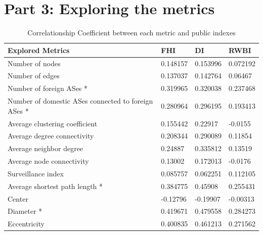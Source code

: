 \documentclass{article}
\begin{document}
\section*{Part 3: Exploring the metrics}

\bigskip

\begin{table}[ht]
\centering
\caption{Correlationship Coefficient between each metric and public indexes}
\label{tab:corrcoeff}
\begin{tabular}{|l|l|l|l|}
\hline
\textbf{Explored Metrics}                              & \textbf{FHI} & \textbf{DI} & \textbf{RWBI} \\ \hline
Number of nodes                                        & 0.148157     & 0.153996    & 0.072192      \\ \hline
Number of edges                                        & 0.137037     & 0.142764    & 0.06467       \\ \hline
Number of foreign ASes *                                & 0.319965     & 0.320038    & 0.237468      \\ \hline
Number of domestic ASes connected to foreign ASes *      & 0.280964     & 0.296195    & 0.193413      \\ \hline
Average clustering coefficient                         & 0.155442     & 0.22917     & -0.0155       \\ \hline
Average degree connectivity                            & 0.208344     & 0.290089    & 0.11854       \\ \hline
Average neighbor degree                                & 0.24887      & 0.335812    & 0.13519       \\ \hline
Average node connectivity                              & 0.13002      & 0.172013    & -0.0176       \\ \hline
Surveillance index                                     & 0.085757     & 0.062251    & 0.112105      \\ \hline
Average shortest path length *                          & 0.384775     & 0.45908     & 0.255431      \\ \hline
Center                                                 & -0.12796     & -0.19907    & -0.00313      \\ \hline
Diameter *                                              & 0.419671     & 0.479558    & 0.284273      \\ \hline
Eccentricity                                           & 0.400835     & 0.461213    & 0.271562      \\ \hline

\end{tabular}
\end{table}
\end{document}
